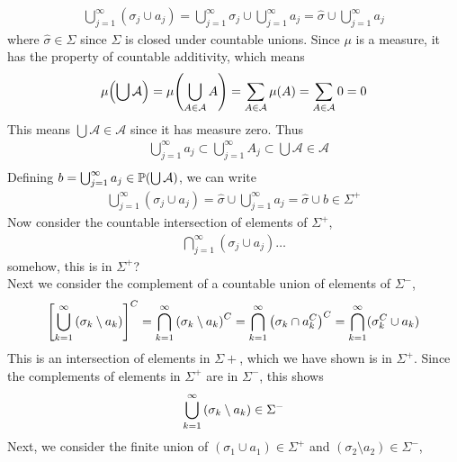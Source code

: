 \documentclass[12pt]{article}
\theoremstyle{plain}
\begin{document}
\begin{enumerate}[(i)]
\begin{align*}
            \bigcup_{j=1}^\infty (\sigma_j \cup a_j) = \bigcup_{j=1}^\infty \sigma_j \cup \bigcup_{j=1}^\infty a_j = \hat{\sigma} \cup \bigcup_{j=1}^\infty a_j
        \end{align*}
        where $\hat{\sigma} \in \Sigma$ since $\Sigma$ is closed under countable unions.  Since $\mu$ is a measure, it has the property of countable additivity, which means
        \begin{align*}
            \mu\qty(\bigcup \mathcal{A}) = \mu\qty(\bigcup_{A\in\mathcal{A}}A) = \sum_{A\in \mathcal{A}}\mu(A) = \sum_{A\in\mathcal{A}}0 = 0
        \end{align*}
        This means $\bigcup \mathcal{A} \in \mathcal{A}$ since it has measure zero.  Thus
        \begin{align*}
            &\bigcup_{j=1}^\infty a_j \subset \bigcup_{j=1}^\infty A_j \subset \bigcup \mathcal{A} \in \mathcal{A} \\
        \end{align*}
        Defining $b = \bigcup_{j=1}^\infty a_j \in \mathbb{P}\qty(\bigcup\mathcal{A})$, we can write
        \begin{align*}
            \bigcup_{j=1}^\infty (\sigma_j \cup a_j) = \hat{\sigma} \cup \bigcup_{j=1}^\infty a_j = \hat{\sigma} \cup b \in \Sigma^+
        \end{align*}
        Now consider the countable intersection of elements of $\Sigma^+$,
        \begin{align*}
            \bigcap_{j=1}^\infty (\sigma_j \cup a_j)\dots
        \end{align*}
        {\color{red} somehow, this is in $\Sigma^+$?} \\
        Next we consider the complement of a countable union of elements of $\Sigma^-$,
        \begin{align*}
            \qty[\bigcup_{k=1}^\infty \qty(\sigma_k \setminus a_k)]^C = \bigcap_{k=1}^\infty \qty(\sigma_k \setminus a_k)^C = \bigcap_{k=1}^\infty \qty(\sigma_k \cap a_k^C)^C = \bigcap_{k=1}^\infty (\sigma_k^C \cup a_k)
        \end{align*}
        {\color{red} This is an intersection of elements in $\Sigma+$, which we have shown is in $\Sigma^+$.  Since the complements of elements in $\Sigma^+$ are in $\Sigma^-$, this shows
        \begin{align*}
            \bigcup_{k=1}^\infty \qty(\sigma_k \setminus a_k) \in \Sigma^-
        \end{align*}
        }
        Next, we consider the finite union of $(\sigma_1 \cup a_1) \in \Sigma^+$ and $(\sigma_2 \setminus a_2) \in \Sigma^-$,

\end{enumerate}
\end{document}
